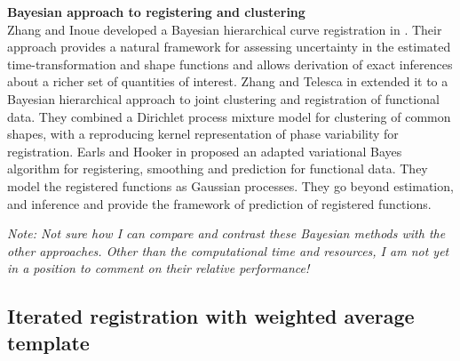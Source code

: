 \noindent
{\bf{Bayesian approach to registering and clustering}} \\
Zhang and Inoue developed a Bayesian hierarchical curve registration in \cite{Telesca_Inoue_2008_JASA}. Their approach provides a natural framework for assessing uncertainty in the estimated time-transformation and shape functions and allows derivation of exact inferences about a richer set of quantities of interest. Zhang and Telesca in \cite{Zhang_Telesca_2014_arXiv} extended it to a Bayesian hierarchical approach to joint clustering and registration of functional data. They combined a Dirichlet process mixture model for clustering of common shapes, with a reproducing kernel representation of phase variability for registration. Earls and Hooker in \cite{Earls_Hooker_2015_arXiv} proposed an adapted variational Bayes algorithm for registering, smoothing and prediction for functional data. They model the registered 
functions as Gaussian processes. They go beyond estimation, and inference and provide the framework of prediction of registered functions. 

{\emph{Note: Not sure how I can compare and contrast these Bayesian methods with the other approaches. Other than the computational time and resources, I am not yet in a position to comment on their relative performance!}}

\subsection{Iterated registration with weighted average template}
